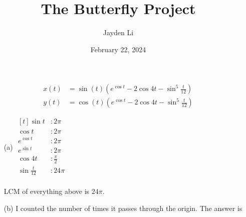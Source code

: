 \documentclass{article}
\title{The Butterfly Project}
\author{Jayden Li}
\date{February 22, 2024}
\begin{document}
\fontsize{11pt}{11pt}\selectfont
\setlength{\abovedisplayskip}{0pt}
\maketitle

\begin{align*}
	x(t)&=\sin(t)\left(e^{\cos t}-2\cos4t-\sin^5\frac{t}{12}\right) \\
	y(t)&=\cos(t)\left(e^{\cos t}-2\cos4t-\sin^5\frac{t}{12}\right)
\end{align*}
\begin{itemize}
\item[(a)]
	$\begin{aligned}[t]
		\sin t&:2\pi \\
		\cos t&:2\pi \\
		e^{\cos t}&:2\pi \\
		e^{\sin t}&:2\pi \\
		\cos4t&:\frac{\pi}{2} \\
		\sin\frac{t}{12}&:24\pi \\
	\end{aligned}$

	LCM of everything above is $24\pi$.


\item[(b)]
	I counted the number of times it passes through the origin. The answer is 


\end{itemize}
\end{document}
